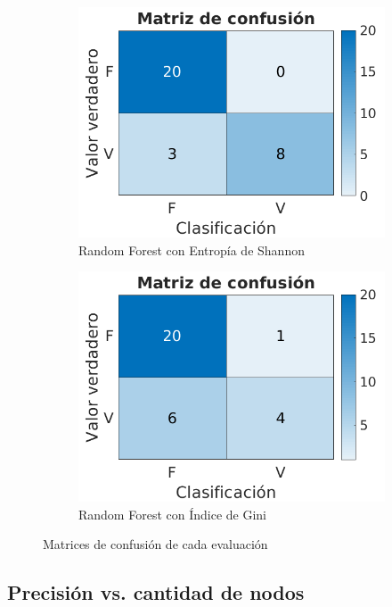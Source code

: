 \documentclass[a4paper]{article}
\begin{document}
\begin{figure}[h]
\begin{subfigure}{.4\textwidth}
      \includegraphics[width=\linewidth]{img/cm-rf-shannon.png}
      \caption{Random Forest con Entropía de Shannon}
      \label{titanic-cm:sfig3}
    \end{subfigure}
    \begin{subfigure}{.4\textwidth}
      \centering
      \includegraphics[width=\linewidth]{img/cm-rf-gini.png}
      \caption{Random Forest con Índice de Gini}
      \label{titanic-cm:sfig4}
    \end{subfigure}
    \caption{Matrices de confusión de cada evaluación}
    \label{titanic-cm:fig}
  \end{figure}

\subsection{Precisión vs. cantidad de nodos}
\end{document}
